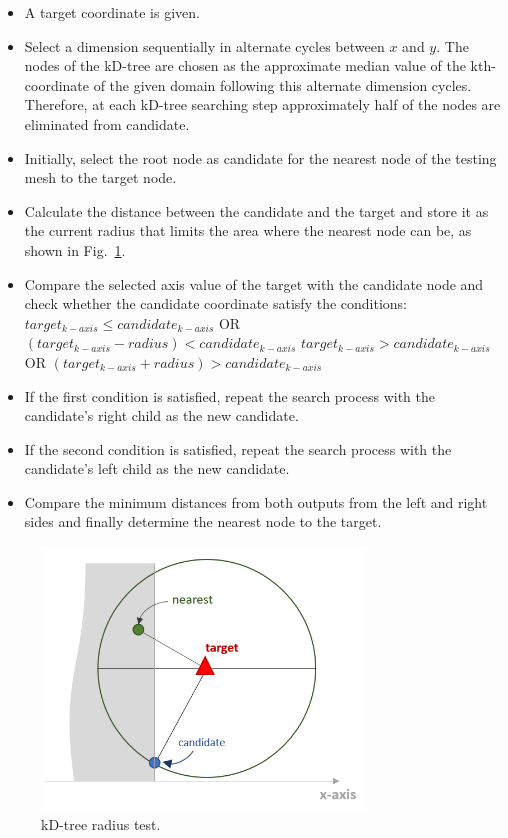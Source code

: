 \begin{itemize}
  \item A target coordinate is given.
  \item Select a dimension sequentially in alternate cycles between $x$ and $y$. The nodes of the kD-tree are chosen as the approximate median value of the kth-coordinate of the given domain following this alternate dimension cycles. Therefore, at each kD-tree searching step approximately half of the nodes are eliminated from candidate. 
  \item Initially, select the root node as candidate for the nearest node of the testing mesh to the target node.
  \item Calculate the distance between the candidate and the target and store it as the current radius that limits the area where the nearest node can be, as shown in Fig.\ \ref{fig:kdtree_radius_test}.
  \item Compare the selected axis value of the target with the candidate node and check whether the candidate coordinate satisfy the conditions:
  \subitem $target_{k-axis} \leq candidate_{k-axis}$ OR $(target_{k-axis} - radius) < candidate_{k-axis}$
  \subitem $target_{k-axis} >  candidate_{k-axis}$ OR $(target_{k-axis} + radius) > candidate_{k-axis}$
  \item If the first condition is satisfied, repeat the search process with the candidate's right child as the new candidate.
  \item If the second condition is satisfied, repeat the search process with the candidate's left child as the new candidate. 
  \item Compare the minimum distances from both outputs from the left and right sides and finally determine the nearest node to the target.
\end{itemize}
\begin{figure}[H]
	\centering
	\includegraphics[height=7.0cm]{figs/overset/kdtree_radius_test.png}
    \caption{kD-tree radius test.}
    \label{fig:kdtree_radius_test}
\end{figure}

